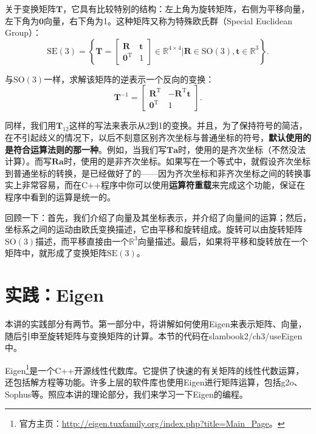 关于变换矩阵$\bm{T}$，它具有比较特别的结构：左上角为旋转矩阵，右侧为平移向量，左下角为$\bm{0}$向量，右下角为1。这种矩阵又称为特殊欧氏群（Special Euclidean Group）：
\begin{equation}
\mathrm{SE}(3) = \left\{ \bm{T} = \left[ {\begin{array}{*{20}{c}}
	\bm{R} & \bm{t} \\
	{{\bm{0}^\mathrm{T}}} & 1
	\end{array}} \right]
\in \mathbb{R}^{4 \times 4} | \bm{R} \in \mathrm{SO}(3), \bm{t} \in \mathbb{R}^3\right\} .
\end{equation}

与$\mathrm{SO}(3)$一样，求解该矩阵的逆表示一个反向的变换：
\begin{equation}
{ \bm{T}^{ - 1}} = \left[ {\begin{array}{*{20}{c}}
	{{\bm{R}^\mathrm{T}}}&{ - {\bm{R}^\mathrm{T}}\bm{t}}\\
	{{\bm{0}^\mathrm{T}}}&1
	\end{array}} \right].
\end{equation}

同样，我们用$\bm{T}_{12}$这样的写法来表示从2到1的变换。并且，为了保持符号的简洁，在不引起歧义的情况下，以后不刻意区别齐次坐标与普通坐标的符号，\textbf{默认使用的是符合运算法则的那一种}。例如，当我们写$\bm{T} \bm{a}$时，使用的是齐次坐标（不然没法计算）。而写$\bm{Ra}$时，使用的是非齐次坐标。如果写在一个等式中，就假设齐次坐标到普通坐标的转换，是已经做好了的——因为齐次坐标和非齐次坐标之间的转换事实上非常容易，而在C++程序中你可以使用\textbf{运算符重载}来完成这个功能，保证在程序中看到的运算是统一的。

回顾一下：首先，我们介绍了向量及其坐标表示，并介绍了向量间的运算；然后，坐标系之间的运动由欧氏变换描述，它由平移和旋转组成。旋转可以由旋转矩阵$\mathrm{SO}(3)$描述，而平移直接由一个$\mathbb{R}^3$向量描述。最后，如果将平移和旋转放在一个矩阵中，就形成了变换矩阵$\mathrm{SE}(3)$。

\section{实践：Eigen}
本讲的实践部分有两节。第一部分中，将讲解如何使用Eigen来表示矩阵、向量，随后引申至旋转矩阵与变换矩阵的计算。本节的代码在slambook2/ch3/useEigen中。

Eigen\footnote{官方主页：\url{http://eigen.tuxfamily.org/index.php?title=Main_Page}。}是一个C++开源线性代数库。它提供了快速的有关矩阵的线性代数运算，还包括解方程等功能。许多上层的软件库也使用Eigen进行矩阵运算，包括g2o、Sophus等。照应本讲的理论部分，我们来学习一下Eigen的编程。

